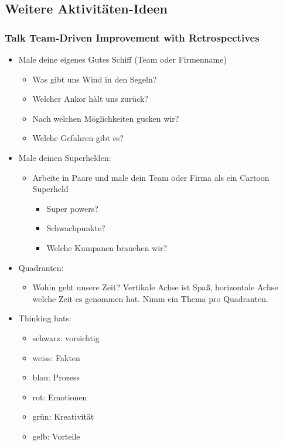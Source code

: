 \subsection{Weitere Aktivitäten-Ideen}
\subsubsection{Talk Team-Driven Improvement with Retrospectives}
\begin{itemize}
  \item Male deine eigenes Gutes Schiff (Team oder Firmenname)
    \begin{itemize}
      \item Was gibt uns Wind in den Segeln?
      \item Welcher Ankor hält uns zurück?
      \item Nach welchen Möglichkeiten gucken wir?
      \item Welche Gefahren gibt es?
    \end{itemize}
  \item Male deinen Superhelden:
    \begin{itemize}
      \item Arbeite in Paare und male dein Team oder Firma als ein Cartoon Superheld
        \begin{itemize}
          \item Super powers?
          \item Schwachpunkte?
          \item Welche Kumpanen brauchen wir?
        \end{itemize}
    \end{itemize}
  \item Quadranten:
    \begin{itemize}
      \item Wohin geht unsere Zeit? Vertikale Achse ist Spaß, horizontale Achse welche Zeit es
        genommen hat. Nimm ein Thema pro Quadranten.
    \end{itemize}
  \item Thinking hats:
    \begin{itemize}
      \item schwarz: vorsichtig
      \item weiss: Fakten
      \item blau: Prozess
      \item rot: Emotionen
      \item grün: Kreativität
      \item gelb: Vorteile

\end{itemize}
\end{itemize}
